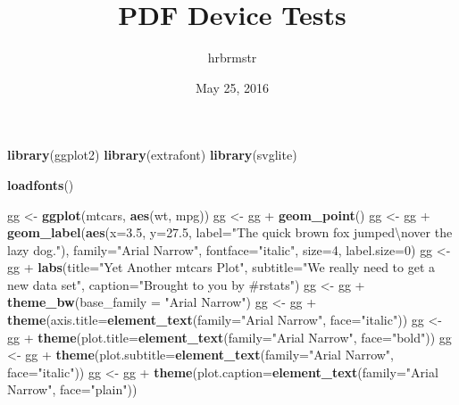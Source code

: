 \documentclass[]{article}
\title{PDF Device Tests}
\author{hrbrmstr}
\date{May 25, 2016}
\newenvironment{Shaded}{\begin{snugshade}}{\end{snugshade}}
\newcommand{\KeywordTok}[1]{\textcolor[rgb]{0.13,0.29,0.53}{\textbf{{#1}}}}
\newcommand{\DataTypeTok}[1]{\textcolor[rgb]{0.13,0.29,0.53}{{#1}}}
\newcommand{\DecValTok}[1]{\textcolor[rgb]{0.00,0.00,0.81}{{#1}}}
\newcommand{\FloatTok}[1]{\textcolor[rgb]{0.00,0.00,0.81}{{#1}}}
\newcommand{\CharTok}[1]{\textcolor[rgb]{0.31,0.60,0.02}{{#1}}}
\newcommand{\StringTok}[1]{\textcolor[rgb]{0.31,0.60,0.02}{{#1}}}
\newcommand{\NormalTok}[1]{{#1}}
\begin{document}
\maketitle

\begin{Shaded}
\begin{Highlighting}[]
\KeywordTok{library}\NormalTok{(ggplot2)}
\KeywordTok{library}\NormalTok{(extrafont)}
\KeywordTok{library}\NormalTok{(svglite)}

\KeywordTok{loadfonts}\NormalTok{()}

\NormalTok{gg <-}\StringTok{ }\KeywordTok{ggplot}\NormalTok{(mtcars, }\KeywordTok{aes}\NormalTok{(wt, mpg))}
\NormalTok{gg <-}\StringTok{ }\NormalTok{gg +}\StringTok{ }\KeywordTok{geom_point}\NormalTok{()}
\NormalTok{gg <-}\StringTok{ }\NormalTok{gg +}\StringTok{ }\KeywordTok{geom_label}\NormalTok{(}\KeywordTok{aes}\NormalTok{(}\DataTypeTok{x=}\FloatTok{3.5}\NormalTok{, }\DataTypeTok{y=}\FloatTok{27.5}\NormalTok{, }\DataTypeTok{label=}\StringTok{"The quick brown fox jumped}\CharTok{\textbackslash{}n}\StringTok{over the lazy dog."}\NormalTok{),}
                      \DataTypeTok{family=}\StringTok{"Arial Narrow"}\NormalTok{, }\DataTypeTok{fontface=}\StringTok{"italic"}\NormalTok{, }\DataTypeTok{size=}\DecValTok{4}\NormalTok{, }\DataTypeTok{label.size=}\DecValTok{0}\NormalTok{)}
\NormalTok{gg <-}\StringTok{ }\NormalTok{gg +}\StringTok{ }\KeywordTok{labs}\NormalTok{(}\DataTypeTok{title=}\StringTok{"Yet Another mtcars Plot"}\NormalTok{,}
                \DataTypeTok{subtitle=}\StringTok{"We really need to get a new data set"}\NormalTok{,}
                \DataTypeTok{caption=}\StringTok{"Brought to you by #rstats"}\NormalTok{)}
\NormalTok{gg <-}\StringTok{ }\NormalTok{gg +}\StringTok{ }\KeywordTok{theme_bw}\NormalTok{(}\DataTypeTok{base_family =} \StringTok{"Arial Narrow"}\NormalTok{)}
\NormalTok{gg <-}\StringTok{ }\NormalTok{gg +}\StringTok{ }\KeywordTok{theme}\NormalTok{(}\DataTypeTok{axis.title=}\KeywordTok{element_text}\NormalTok{(}\DataTypeTok{family=}\StringTok{"Arial Narrow"}\NormalTok{, }\DataTypeTok{face=}\StringTok{"italic"}\NormalTok{))}
\NormalTok{gg <-}\StringTok{ }\NormalTok{gg +}\StringTok{ }\KeywordTok{theme}\NormalTok{(}\DataTypeTok{plot.title=}\KeywordTok{element_text}\NormalTok{(}\DataTypeTok{family=}\StringTok{"Arial Narrow"}\NormalTok{, }\DataTypeTok{face=}\StringTok{"bold"}\NormalTok{))}
\NormalTok{gg <-}\StringTok{ }\NormalTok{gg +}\StringTok{ }\KeywordTok{theme}\NormalTok{(}\DataTypeTok{plot.subtitle=}\KeywordTok{element_text}\NormalTok{(}\DataTypeTok{family=}\StringTok{"Arial Narrow"}\NormalTok{, }\DataTypeTok{face=}\StringTok{"italic"}\NormalTok{))}
\NormalTok{gg <-}\StringTok{ }\NormalTok{gg +}\StringTok{ }\KeywordTok{theme}\NormalTok{(}\DataTypeTok{plot.caption=}\KeywordTok{element_text}\NormalTok{(}\DataTypeTok{family=}\StringTok{"Arial Narrow"}\NormalTok{, }\DataTypeTok{face=}\StringTok{"plain"}\NormalTok{))}
\end{Highlighting}
\end{Shaded}
\end{document}
